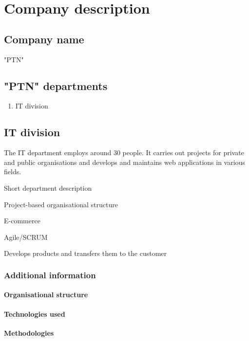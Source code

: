 \section{Company description}

\subsection{Company name}
"PTN"

\subsection{"PTN" departments}

\begin{enumerate}
    \item  IT division
\end{enumerate}

\subsection{IT division}

The IT department employs around 30 people. It carries out projects for private and public organisations and develops and maintains web applications in various fields.

Short department description

Project-based organisational structure

E-commerce

Agile/SCRUM

Develops products and transfers them to the customer

\subsubsection{Additional information}

\paragraph{Organisational structure}
\paragraph{Technologies used}
\paragraph{Methodologies}
